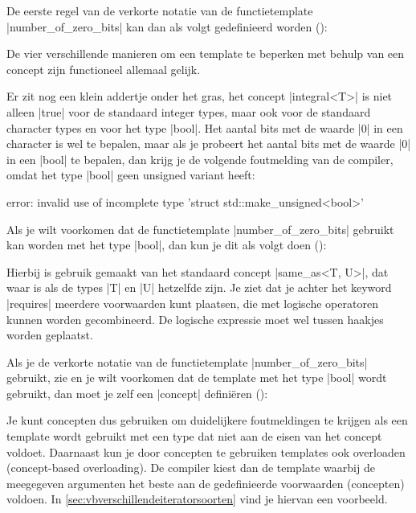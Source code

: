 \begin{cpplstShortInline}
De eerste regel van de verkorte notatie van de functietemplate |number_of_zero_bits| kan dan als volgt gedefinieerd worden ():
\label{prog:number_of_zero_bits6}

De vier verschillende manieren om een template te beperken met behulp van een concept zijn functioneel allemaal gelijk.

Er zit nog een klein addertje onder het gras, het concept |integral<T>| is niet alleen |true| voor de standaard integer types, maar ook voor de standaard character types en voor het type |bool|.
Het aantal bits met de waarde |0| in een character is wel te bepalen, maar als je probeert het aantal bits met de waarde |0| in een |bool| te bepalen, dan krijg je de volgende foutmelding van de compiler, omdat het type |bool| geen unsigned variant heeft:
\begin{coutput}
error: invalid use of incomplete type 'struct std::make_unsigned<bool>'
\end{coutput}

Als je wilt voorkomen dat de functietemplate |number_of_zero_bits| gebruikt kan worden met het type |bool|, dan kun je dit als volgt doen ():

Hierbij is gebruik gemaakt van het standaard concept |same_as<T, U>|, dat waar is als de types |T| en |U| hetzelfde zijn.
Je ziet dat je achter het keyword |requires| meerdere voorwaarden kunt plaatsen, die met logische operatoren kunnen worden gecombineerd.
De logische expressie moet wel tussen haakjes worden geplaatst.

Als je de verkorte notatie van de functietemplate |number_of_zero_bits| gebruikt, zie  en je wilt voorkomen dat de template met het type |bool| wordt gebruikt, dan moet je zelf een |concept| definiëren ():

Je kunt concepten dus gebruiken om duidelijkere foutmeldingen te krijgen als een template wordt gebruikt met een type dat niet aan de eisen van het concept voldoet.
Daarnaast kun je door concepten te gebruiken templates ook overloaden (concept-based overloading).
De compiler kiest dan de template waarbij de meegegeven argumenten het beste aan de gedefinieerde voorwaarden (concepten) voldoen.
In \cref{sec:vbverschillendeiteratorsoorten} vind je hiervan een voorbeeld.


\end{cpplstShortInline}
